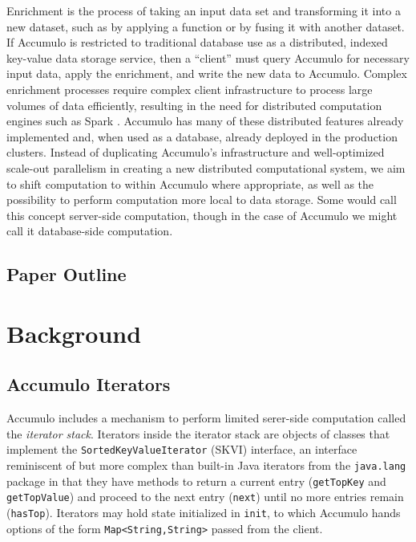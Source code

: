 Enrichment \cite{x} is the process of taking an input data set and transforming it into a new dataset, such as by 
applying a function or by fusing it with another dataset.
If Accumulo is restricted to traditional database use as a distributed, indexed key-value data storage service,
then a ``client'' must query Accumulo for necessary input data, apply the enrichment, and write the new data 
to Accumulo.  
Complex enrichment processes require complex client infrastructure to process large volumes of data efficiently,
resulting in the need for distributed computation engines such as Spark \cite{x}.
Accumulo has many of these distributed features already implemented and, when used as a database, 
already deployed in the production clusters. 
Instead of duplicating Accumulo's infrastructure and well-optimized scale-out parallelism
in creating a new distributed computational system, we aim to shift computation 
to within Accumulo where appropriate,
as well as the possibility to perform computation more local to data storage.
Some would call this concept server-side computation, though in the case of Accumulo we might call it 
database-side computation.



\subsection{Paper Outline}



\section{Background}
\label{sBackground}







\subsection{Accumulo Iterators}
Accumulo includes a mechanism to perform limited serer-side computation called the 
\emph{iterator stack}.  Iterators inside the iterator stack are objects of classes
that implement the \texttt{SortedKeyValueIterator} (SKVI) interface, an interface
reminiscent of but more complex than built-in Java iterators from the \texttt{java.lang} package
in that they have methods to return a current entry (\texttt{getTopKey} and \texttt{getTopValue})
and proceed to the next entry (\texttt{next}) until no more entries remain (\texttt{hasTop}).
Iterators may hold state initialized in \texttt{init}, to which Accumulo hands 
options of the form \texttt{Map<String,String>} passed from the client.%

